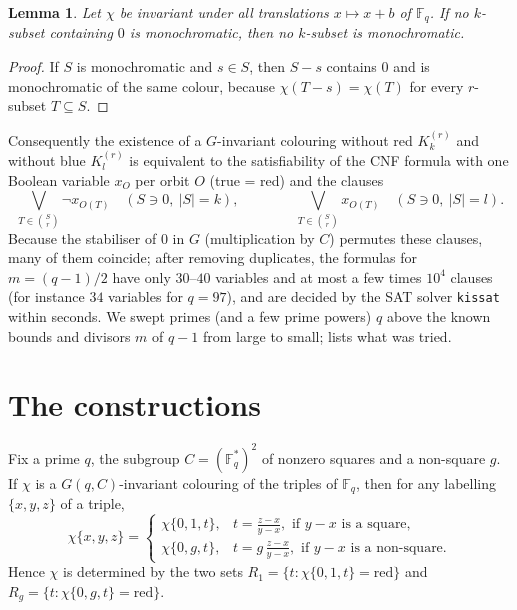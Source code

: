 \documentclass[11pt]{article}
\newtheorem{lemma}[theorem]{Lemma}
\theoremstyle{definition}
\theoremstyle{remark}
\newcommand{\F}{\mathbb F}
\begin{document}
\begin{lemma}\label{lem:through0}
Let $\chi$ be invariant under all translations $x\mapsto x+b$ of $\F_q$. If no $k$-subset containing $0$ is
monochromatic, then no $k$-subset is monochromatic.
\end{lemma}
\begin{proof}
If $S$ is monochromatic and $s\in S$, then $S-s$ contains $0$ and is monochromatic of the same colour,
because $\chi(T-s)=\chi(T)$ for every $r$-subset $T\subseteq S$.
\end{proof}

Consequently the existence of a $G$-invariant colouring without red $K_k^{(r)}$ and without blue
$K_l^{(r)}$ is equivalent to the satisfiability of the CNF formula with one Boolean variable $x_O$ per orbit
$O$ (true = red) and the clauses
\[
 \bigvee_{T\in\binom{S}{r}} \neg x_{O(T)}\quad (S\ni 0,\ |S|=k),\qquad\qquad
 \bigvee_{T\in\binom{S}{r}} x_{O(T)}\quad (S\ni 0,\ |S|=l).
\]
Because the stabiliser of $0$ in $G$ (multiplication by $C$) permutes these clauses, many of them coincide;
after removing duplicates, the formulas for $m=(q-1)/2$ have only $30$--$40$ variables and at most a few times
$10^4$ clauses (for instance $34$ variables for $q=97$), and are decided by the SAT solver
\texttt{kissat}~\cite{kissat} within seconds. We swept primes (and a few prime powers) $q$ above the
known bounds and divisors $m$ of $q-1$ from large to small;  lists what was tried.

\section{The constructions}\label{sec:constr}

Fix a prime $q$, the subgroup $C=(\F_q^{*})^2$ of nonzero squares and a non-square $g$. If $\chi$ is a
$G(q,C)$-invariant colouring of the triples of $\F_q$, then for any labelling $\{x,y,z\}$ of a triple,
\[
  \chi\{x,y,z\}=\begin{cases}\chi\{0,1,t\}, & t=\frac{z-x}{y-x}, \text{ if } y-x \text{ is a square},\\[2pt]
  \chi\{0,g,t\}, & t=g\,\frac{z-x}{y-x}, \text{ if } y-x \text{ is a non-square}.\end{cases}
\]
Hence $\chi$ is determined by the two sets
$R_1=\{t:\chi\{0,1,t\}=\text{red}\}$ and $R_g=\{t:\chi\{0,g,t\}=\text{red}\}$.
\end{document}
